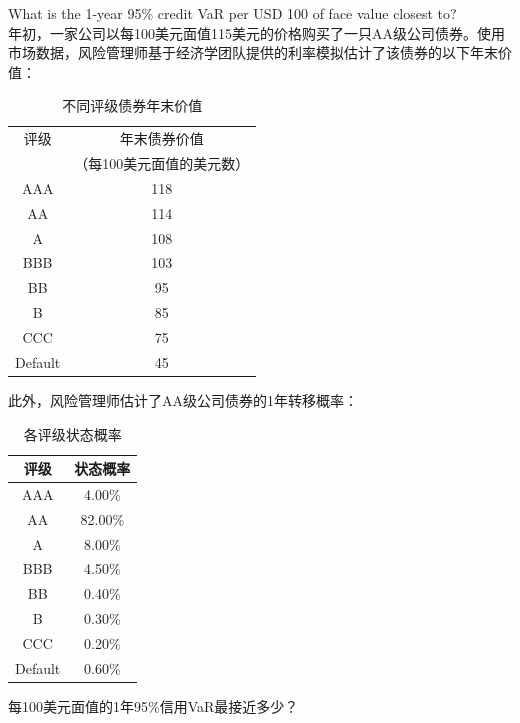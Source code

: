 \documentclass{article}
\newcounter{question} %
\begin{document}
\begin{question}
    What is the 1-year 95\% credit VaR per USD 100 of face value closest to?
    \\    年初，一家公司以每100美元面值115美元的价格购买了一只AA级公司债券。使用市场数据，风险管理师基于经济学团队提供的利率模拟估计了该债券的以下年末价值：

    \begin{table}[htbp]
        \centering
        \begin{tabular}{|c|c|}
            \hline
            评级 & 年末债券价值 \\
            & （每100美元面值的美元数） \\
            \hline
            AAA     & 118 \\
            AA      & 114 \\
            A       & 108 \\
            BBB     & 103 \\
            BB      & 95  \\
            B       & 85  \\
            CCC     & 75  \\
            Default & 45  \\
            \hline
        \end{tabular}
        \caption{不同评级债券年末价值}
    \end{table}

    此外，风险管理师估计了AA级公司债券的1年转移概率： 
    \begin{table}[htbp]
        \centering
        \begin{tabular}{|c|c|}
            \hline
            评级 & 状态概率 \\
            \hline
            AAA     & 4.00\% \\
            AA      & 82.00\% \\
            A       & 8.00\% \\
            BBB     & 4.50\% \\
            BB      & 0.40\% \\
            B       & 0.30\% \\
            CCC     & 0.20\% \\
            Default & 0.60\% \\
            \hline
        \end{tabular}
        \caption{各评级状态概率}
    \end{table}

    每100美元面值的1年95\%信用VaR最接近多少？
\end{question}
\end{document}
